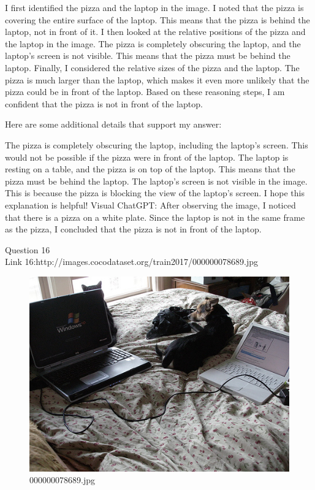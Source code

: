 \begin{enumerate}
        I first identified the pizza and the laptop in the image.
        I noted that the pizza is covering the entire surface of the laptop. This means that the pizza is behind the laptop, not in front of it.
        I then looked at the relative positions of the pizza and the laptop in the image. The pizza is completely obscuring the laptop, and the laptop's screen is not visible. This means that the pizza must be behind the laptop.
        Finally, I considered the relative sizes of the pizza and the laptop. The pizza is much larger than the laptop, which makes it even more unlikely that the pizza could be in front of the laptop.
        Based on these reasoning steps, I am confident that the pizza is not in front of the laptop.

        Here are some additional details that support my answer:

        The pizza is completely obscuring the laptop, including the laptop's screen. This would not be possible if the pizza were in front of the laptop.
        The laptop is resting on a table, and the pizza is on top of the laptop. This means that the pizza must be behind the laptop.
        The laptop's screen is not visible in the image. This is because the pizza is blocking the view of the laptop's screen.
        I hope this explanation is helpful!
        \subitem Visual ChatGPT: After observing the image, I noticed that there is a pizza on a white plate. Since the laptop is not in the same frame as the pizza, I concluded that the pizza is not in front of the laptop.
    \end{enumerate}
Question 16\\
Link 16:http://images.cocodataset.org/train2017/000000078689.jpg
    \begin{figure}[h]
        \centering
        \includegraphics[width=0.8\linewidth]{../image set/easy/000000078689.jpg}
        \caption{000000078689.jpg}
    \end{figure}
